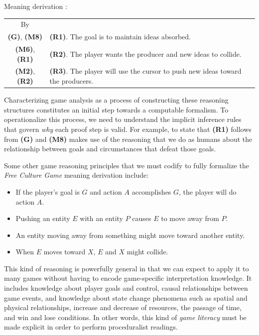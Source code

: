 \documentclass[a4paper]{article}
\begin{document}
Meaning derivation  :

\begin{tabular}{cp{6.5cm}}
 By & \\
 \textbf{(G)}, \textbf{(M8)} & \textbf{(R1)}. The goal is to maintain ideas absorbed.\\
 \textbf{(M6)}, \textbf{(R1)} & \textbf{(R2)}. The player wants the producer and new ideas to collide.\\
 \textbf{(M2)}, \textbf{(R2)} & \textbf{(R3)}. The player will use the cursor to push new ideas toward the
producers.
\end{tabular}



Characterizing game analysis as a process of constructing these
reasoning structures constitutes an initial step towards a computable
formalism. To operationalize this process, we need to understand the
implicit inference rules that govern {\em why} each proof step is valid.
For example, to state that \textbf{(R1)} follows from \textbf{(G)} and \textbf{(M8)} makes use of the
reasoning that we do as humans about the relationship between goals and
circumstances that defeat those goals.

Some other game reasoning principles that we must codify to fully formalize
the {\em Free Culture Game} meaning derivation include:

\begin{itemize}
\item If the player's goal is $G$ and action $A$ accomplishes $G$, the player will do action $A$.
\item Pushing an entity $E$ with an entity $P$ causes $E$ to move away from $P$.
\item An entity moving away from something might move toward another entity.
\item When $E$ moves toward $X$, $E$ and $X$ might collide.
\end{itemize}

This kind of reasoning is powerfully general in that we can expect to apply
it to many games without having to encode game-specific interpretation knowledge. 
It includes knowledge about player goals and control, causal relationships
between game events, and knowledge about state change phenomena such as
spatial and physical relationships, increase and decrease of resources, the
passage of time, and win and lose conditions. In other words, this kind of
{\em game literacy} must be made explicit in order to perform proceduralist readings.  
\end{document}
